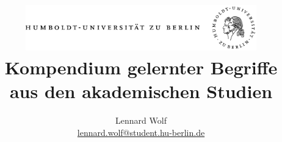 \documentclass[twoside,twocolumn]{book}
\begin{document}
\title{
	\includegraphics*[width=0.75\textwidth]{images/hu_logo.png}\\
	\vspace{24pt}
	Kompendium gelernter Begriffe\\aus den akademischen Studien}
\author{Lennard Wolf\\
        \href{mailto:lennard.wolf@student.hu-berlin.de}{lennard.wolf@student.hu-berlin.de}}
\maketitle

\begin{dictionary}





\end{dictionary}
\end{document}
